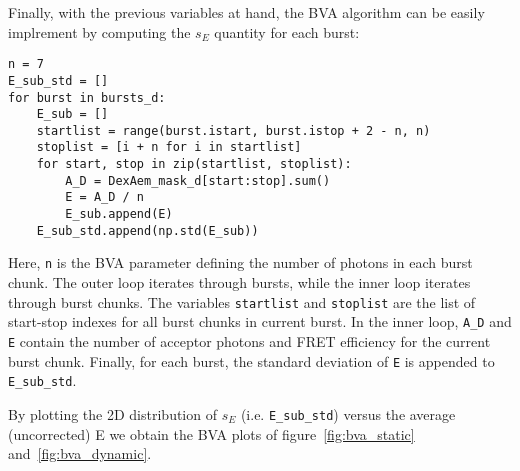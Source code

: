 Finally, with the previous variables at hand, the BVA algorithm
can be easily implrement by computing the $s_E$ quantity for each burst:

\begin{lstlisting}
n = 7
E_sub_std = []
for burst in bursts_d:
    E_sub = []
    startlist = range(burst.istart, burst.istop + 2 - n, n)
    stoplist = [i + n for i in startlist]
    for start, stop in zip(startlist, stoplist): 
        A_D = DexAem_mask_d[start:stop].sum()
        E = A_D / n
        E_sub.append(E)
    E_sub_std.append(np.std(E_sub))
\end{lstlisting}

Here, \verb|n| is the BVA parameter defining the number of photons in each burst chunk. 
The outer loop iterates through bursts, while the inner loop iterates through burst chunks.
The variables \verb|startlist| and \verb|stoplist| are the list of start-stop indexes for
all burst chunks in current burst.
In the inner loop, \verb|A_D| and \verb|E| contain the number of acceptor photons and 
FRET efficiency for the current burst chunk. Finally, for each burst, the standard deviation 
of \verb|E| is appended to \verb|E_sub_std|.

By plotting the 2D distribution of $s_E$ (i.e. \verb|E_sub_std|) versus the average (uncorrected) E 
we obtain the BVA plots of figure~\ref{fig:bva_static} and~\ref{fig:bva_dynamic}.


